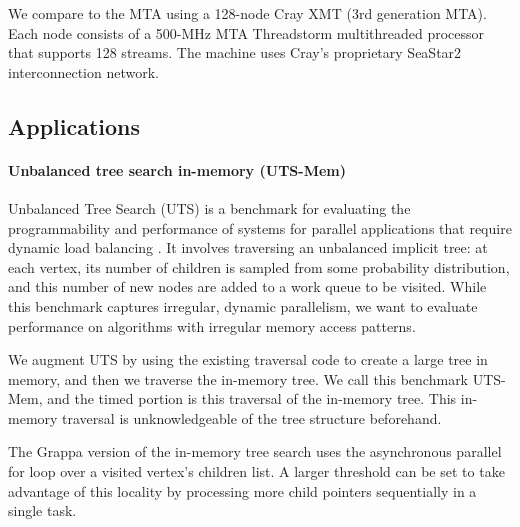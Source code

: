We compare to the MTA using a 128-node Cray XMT (3rd generation MTA). 
Each node consists of a 500-MHz MTA Threadstorm multithreaded
processor that supports 128 streams. The machine uses Cray's proprietary
SeaStar2 interconnection network.

\subsection{Applications}

\paragraph{Unbalanced tree search in-memory (UTS-Mem)}
Unbalanced Tree Search (UTS) is a benchmark
for evaluating the programmability and performance of systems for
parallel applications that require dynamic load balancing
\cite{Olivier:uts2006}. It involves traversing an unbalanced implicit
tree: at each vertex, its number of children is sampled from some
probability distribution, and this number of new nodes are added to a
work queue to be visited. While this benchmark captures irregular,
dynamic parallelism, we want to evaluate performance on algorithms
with irregular memory access patterns.

We augment UTS by using the existing traversal code to
create a large tree in memory, and then we traverse the in-memory
tree. We call this benchmark UTS-Mem, and the timed portion is this
traversal of the in-memory tree. This in-memory traversal is
unknowledgeable of the tree structure beforehand.


The Grappa version of the in-memory tree search uses the
asynchronous parallel for loop over a visited vertex's children 
list. A larger threshold can be set to take advantage of this 
locality by processing more child pointers sequentially in a single task.

